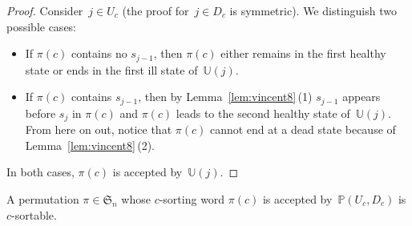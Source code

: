 \documentclass[ALCO]{cedram}
\newcommand{\fS}{\mathfrak{S}}
\newcommand{\automatonP}{\mathbb{P}}
\newcommand{\automatonU}{\mathbb{U}}
\begin{document}
\begin{proof}
Consider~$j \in U_c$ (the proof for~$j \in D_c$ is symmetric).
We distinguish two possible cases:
\begin{itemize}
	\item If $\pi(c)$ contains no $s_{j-1}$, then $\pi(c)$ either remains in the first healthy state or ends in the first ill state of~$\automatonU(j)$.
	\item If $\pi(c)$ contains $s_{j-1}$, then by Lemma~\ref{lem:vincent8}\,(1) $s_{j-1}$ appears before $s_j$ in $\pi(c)$ and $\pi(c)$ leads to the second healthy state of~$\automatonU(j)$. From here on out, notice that $\pi(c)$ cannot end at a dead state because of Lemma~\ref{lem:vincent8}\,(2). 
\end{itemize}
In both cases, $\pi(c)$ is accepted by~$\automatonU(j)$.
\end{proof}

\begin{lemma}\label{lem:Vincent10}
A permutation $\pi \in \fS_n$ whose $c$-sorting word $\pi(c)$ is accepted by~$\automatonP(U_c, D_c)$ is $c$-sortable.
\end{lemma}
\end{document}

